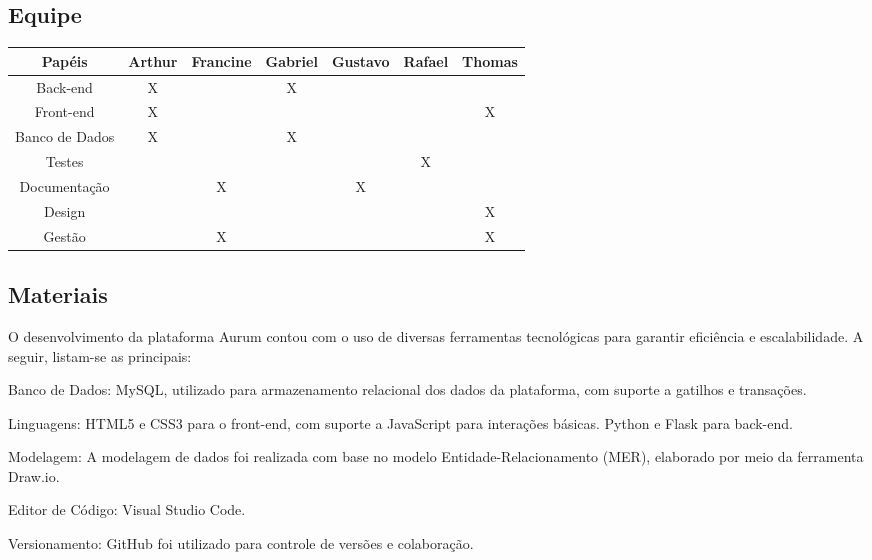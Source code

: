 \documentclass[
	article,			%
	12pt,				%
	oneside,			%
	a4paper,			%
	english,			%
	brazil,				%
	sumario=tradicional
	]{abntex2}
\begin{document}
\subsection{Equipe}

    \begin{tabular}{|c|c|c|c|c|c|c|}
    \hline
        Papéis         & Arthur & Francine & Gabriel & Gustavo & Rafael & Thomas \\ \hline
        Back-end       & X      &          & X       &         &        &        \\ \hline
        Front-end      & X      &          &         &         &        & X      \\ \hline
        Banco de Dados & X      &          & X       &         &        &        \\ \hline
        Testes         &        &          &         &         & X      &        \\ \hline
        Documentação   &        & X        &         & X       &        &        \\ \hline
        Design         &        &          &         &         &        & X      \\ \hline
        Gestão         &        & X        &         &         &        & X      \\ \hline
    \end{tabular}


    

\subsection{Materiais}
O desenvolvimento da plataforma Aurum contou com o uso de diversas ferramentas tecnológicas para garantir eficiência e escalabilidade. A seguir, listam-se as principais:

Banco de Dados: MySQL, utilizado para armazenamento relacional dos dados da plataforma, com suporte a gatilhos e transações.

Linguagens: HTML5 e CSS3 para o front-end, com suporte a JavaScript para interações básicas. Python e Flask para back-end.

Modelagem: A modelagem de dados foi realizada com base no modelo Entidade-Relacionamento (MER), elaborado por meio da ferramenta Draw.io.

Editor de Código: Visual Studio Code.

Versionamento: GitHub foi utilizado para controle de versões e colaboração.
\end{document}
